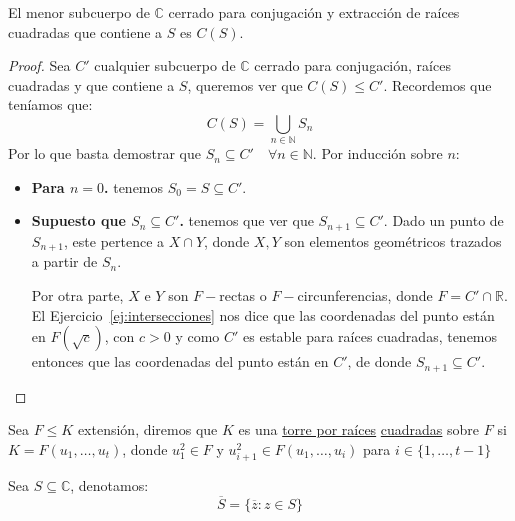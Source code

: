 \begin{teo}
    El menor subcuerpo de $\mathbb{C}$ cerrado para conjugación y extracción de raíces cuadradas que contiene a $S$ es $C(S)$.
    \begin{proof}
        Sea $C'$ cualquier subcuerpo de $\mathbb{C}$ cerrado para conjugación, raíces cuadradas y que contiene a $S$, queremos ver que $C(S)\leq C'$. Recordemos que teníamos que:
        \begin{equation*}
            C(S) = \bigcup_{n\in \mathbb{N}} S_n
        \end{equation*}
        Por lo que basta demostrar que $S_n\subseteq C' \quad \forall n\in \mathbb{N}$. Por inducción sobre $n$:
        \begin{itemize}
            \item \textbf{Para $n=0$.} tenemos $S_0 = S\subseteq C'$.
            \item \textbf{Supuesto que $S_n\subseteq C'$.} tenemos que ver que $S_{n+1}\subseteq C'$. Dado un punto de $S_{n+1}$, este pertence a $X\cap Y$, donde $X,Y$ son elementos geométricos trazados a partir de $S_n$. 

                Por otra parte, $X$ e $Y$ son $F-$rectas o $F-$circunferencias, donde $F=C'\cap \mathbb{R}$. El Ejercicio~\ref{ej:intersecciones} nos dice que las coordenadas del punto están en $F(\sqrt{c})$, con $c>0$ y como $C'$ es estable para raíces cuadradas, tenemos entonces que las coordenadas del punto están en $C'$, de donde $S_{n+1}\subseteq C'$.
        \end{itemize}
    \end{proof}
\end{teo}

\begin{definicion}
    Sea $F\leq K$ extensión, diremos que $K$ es una \underline{torre por raíces} \underline{cuadradas} sobre $F$ si $K = F(u_1, \ldots, u_t)$, donde $u_1^2 \in F$ y $u_{i+1}^2 \in F(u_1, \ldots, u_i)$ para $i \in \{1,\ldots,t-1\}$
\end{definicion}

\begin{notacion}
    Sea $S\subseteq \mathbb{C}$, denotamos:
    \begin{equation*}
        \overline{S} = \{\overline{z}:z\in S\}
    \end{equation*}
\end{notacion}

